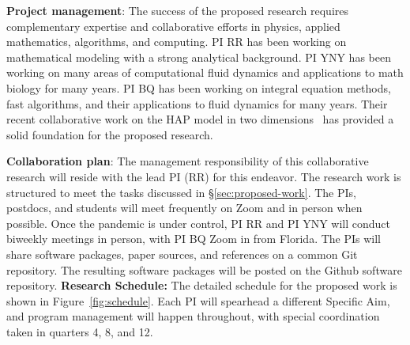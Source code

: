 \textbf{Project management}: 
%
The success of the proposed research requires complementary expertise
and collaborative efforts in physics, applied mathematics, algorithms,
and computing. PI RR has been working on mathematical modeling with a
strong analytical background. PI YNY has been working on many areas of
computational fluid dynamics and applications to math biology for many
years. PI BQ has been working on integral equation methods, fast
algorithms, and their applications to fluid dynamics for many years.
Their recent collaborative work on the HAP model in two
dimensions~\cite{FuQuRyYo22} has provided a solid foundation for the
proposed research.

\smallskip

\textbf{Collaboration plan}: 
%
The management responsibility of this collaborative research will reside
with the lead PI (RR) for this endeavor. The research work is structured
to meet the tasks discussed in \S\ref{sec:proposed-work}. The PIs,
postdocs, and students will meet frequently on Zoom and in person when
possible.
Once the pandemic is under control, PI RR and PI
YNY will conduct biweekly meetings in person, with PI BQ Zoom in from
Florida. The PIs will share software packages, paper sources, and
references on a common \textsf{Git} repository. The resulting software
packages will be posted on the \textsf{Github} software repository.
%
%
\textbf{Research Schedule:} The detailed schedule for the proposed work
is shown in Figure~\ref{fig:schedule}. Each PI will spearhead a
different Specific Aim, and program management will happen
throughout, with special coordination taken in quarters 4, 8, and
12.


